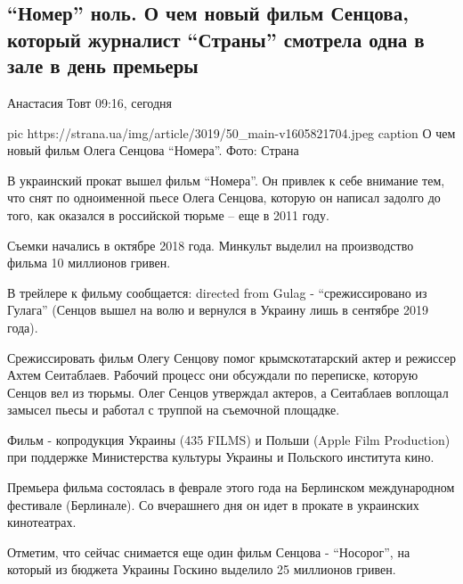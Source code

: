  
 
 

\subsection{\enquote{Номер} ноль. О чем новый фильм Сенцова, который журналист \enquote{Страны} смотрела одна в зале в день премьеры}

Анастасия Товт 09:16, сегодня

\ifcmt
pic https://strana.ua/img/article/3019/50_main-v1605821704.jpeg
caption О чем новый фильм Олега Сенцова \enquote{Номера}. Фото: Страна
\fi

В украинский прокат вышел фильм \enquote{Номера}. Он привлек к себе внимание тем,
что снят по одноименной пьесе Олега Сенцова, которую он написал задолго до
того, как оказался в российской тюрьме – еще в 2011 году.

Съемки начались в октябре 2018 года. Минкульт выделил на производство
фильма 10 миллионов гривен.

В трейлере к фильму сообщается: directed from Gulag - \enquote{срежиссировано из
Гулага} (Сенцов вышел на волю и вернулся в Украину лишь в сентябре 2019
года).

Срежиссировать фильм Олегу Сенцову помог крымскотатарский актер и
режиссер Ахтем Сеитаблаев. Рабочий процесс они обсуждали по переписке,
которую Сенцов вел из тюрьмы. Олег Сенцов утверждал актеров, а Сеитаблаев
воплощал замысел пьесы и работал с труппой на съемочной площадке. 

Фильм - копродукция Украины (435 FILMS) и Польши (Apple Film Production)
при поддержке Министерства культуры Украины и Польского института кино.

Премьера фильма состоялась в феврале этого года на Берлинском
международном фестивале (Берлинале). Со вчерашнего дня он идет в прокате в
украинских кинотеатрах.

Отметим, что сейчас снимается еще один фильм Сенцова - \enquote{Носорог}, на
который из бюджета Украины Госкино выделило 25 миллионов гривен.

